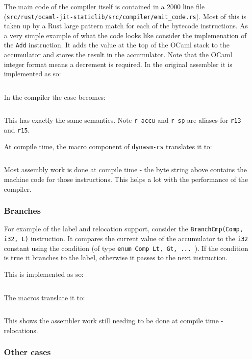 The main code of the compiler itself is contained in a 2000 line file
(\texttt{src/rust/ocaml-jit-staticlib/src/compiler/emit\_code.rs}). Most of this is taken up by a
Rust large pattern match for each of the bytecode instructions. As a very simple example of what
the code looks like consider the implemenation of the \texttt{Add} instruction. It adds the value
at the top of the OCaml stack to the accumulator and stores the result in the accumulator. Note
that the OCaml integer format means a decrement is required. In the original assembler it is
implemented as so:

\inputminted{c}{snippets/add.c}

In the compiler the case becomes:

\inputminted{rust}{snippets/add.rs}

This has exactly the same semantics. Note \texttt{r\_accu} and \texttt{r\_sp}
are aliases for \texttt{r13} and \texttt{r15}.

At compile time, the macro component of \texttt{dynasm-rs} translates it to:

\inputminted{rust}{snippets/add_comp.rs}

Most assembly work is done at compile time - the byte string above contains the machine code for
those instructions. This helps a lot with the performance of the compiler.

\subsubsection{Branches}

For example of the label and relocation support, consider the \texttt{BranchCmp(Comp, i32, L)}
instruction. It
compares the current value of the accumulator to the \texttt{i32} constant using the condition (of
type \texttt{enum Comp {Lt, Gt, ... }}). If the condition is true it branches to the label,
otherwise it passes to the next instruction.

This is implemented as so:

\inputminted{rust}{snippets/branchcmp.rs}

The macros translate it to:

\inputminted{rust}{snippets/branchcmp_comp.rs}

This shows the assembler work still needing to be done at compile time - relocations.

\subsubsection{Other cases}

